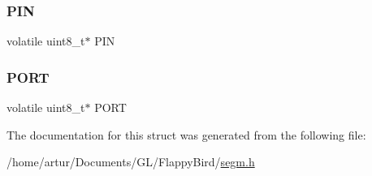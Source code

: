 \subsubsection{\texorpdfstring{P\+IN}{PIN}}
{\footnotesize\ttfamily volatile uint8\+\_\+t$\ast$ P\+IN}

\mbox{\label{structsegm___port_a0650eab751bc2dd1828ec6029ce5a688}} 
\subsubsection{\texorpdfstring{P\+O\+RT}{PORT}}
{\footnotesize\ttfamily volatile uint8\+\_\+t$\ast$ P\+O\+RT}



The documentation for this struct was generated from the following file\+:\begin{DoxyCompactItemize}
\item 
/home/artur/\+Documents/\+G\+L/\+Flappy\+Bird/\mbox{\hyperlink{segm_8h}{segm.\+h}}\end{DoxyCompactItemize}
